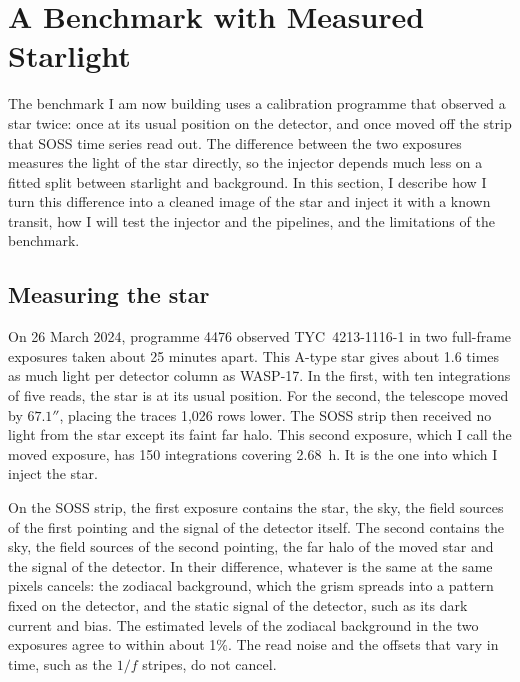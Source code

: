 \section{A Benchmark with Measured Starlight}
\label{sec:measured-benchmark}

The benchmark I am now building uses a calibration programme that observed a
star twice: once at its usual position on the detector, and once moved off
the strip that SOSS time series read out. The difference between the two
exposures measures the light of the star directly, so the injector depends
much less on a fitted split between starlight and background. In this
section, I describe how I turn this difference into a cleaned image of the
star and inject it with a known transit, how I will test the injector and the
pipelines, and the limitations of the benchmark.

\subsection{Measuring the star}
\label{sec:measuring-star}

On 26 March 2024, programme 4476 \citep{VolkEspinoza2023} observed
TYC~4213-1116-1 in two full-frame exposures taken about 25 minutes apart.
This A-type star gives about 1.6 times as much light per detector column as
WASP-17. In the
first, with ten integrations of five reads, the star is at its usual
position. For the second, the telescope moved by $67.1''$, placing the traces
1,026 rows lower. The SOSS strip then received no light from the star except
its faint far halo. This second exposure, which I call the moved exposure, has 150 integrations
covering 2.68~h. It is the one into which I inject the star.

On the SOSS strip, the first exposure contains the star, the sky, the field
sources of the first pointing and the signal of the detector itself. The
second contains the sky, the field sources of the second pointing, the far
halo of the moved star and the signal of the detector. In their difference,
whatever is the same at the same pixels cancels: the zodiacal background,
which the grism spreads into a pattern fixed on the detector, and the static
signal of the detector, such as its dark current and bias. The estimated
levels of the zodiacal background in the two exposures agree to within about
1\%. The read noise and the offsets that vary in time, such as the $1/f$
stripes, do not cancel.

